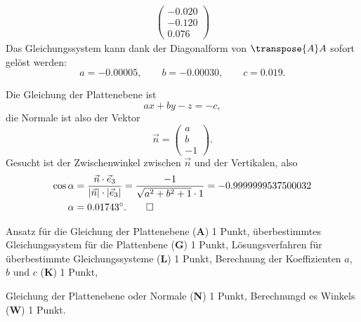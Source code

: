\begin{loesung}
\begin{teilaufgaben}
\begin{align*}
\begin{pmatrix}
-0.020\\
-0.120\\
0.076
\end{pmatrix}
\end{align*}
Das Gleichungssystem kann dank der Diagonalform von $\transpose{A}A$
sofort gelöst werden:
\[
a=-0.00005,\qquad b=-0.00030,\qquad c=0.019.
\]
\item
Die Gleichung der Plattenebene ist
\[
ax+by-z=-c,
\]
die Normale ist also der Vektor
\[
\vec n=\begin{pmatrix}a\\b\\-1\end{pmatrix}.
\]
Gesucht ist der Zwischenwinkel zwischen $\vec n$ und der Vertikalen,
also
\begin{align*}
\cos\alpha&=\frac{\vec n\cdot\vec e_3}{|\vec n|\cdot|\vec e_3|}
=\frac{-1}{\sqrt{a^2+b^2+1}\cdot 1}
=-0.9999999537500032\\
\alpha&=0.01743^\circ.
\qedhere
\end{align*}
\end{teilaufgaben}
\end{loesung}

\begin{bewertung}
\begin{teilaufgaben}
\item
Ansatz für die Gleichung der Plattenebene (\textbf{A}) 1 Punkt,
überbestimmtes Gleichungssystem für die Plattenbene (\textbf{G}) 1 Punkt,
Lösungsverfahren für überbestimmte Gleichungssysteme (\textbf{L}) 1 Punkt,
Berechnung der Koeffizienten $a$, $b$ und $c$ (\textbf{K}) 1 Punkt,
\item
Gleichung der Plattenebene oder Normale (\textbf{N}) 1 Punkt,
Berechnungd es Winkels (\textbf{W}) 1 Punkt.
\end{teilaufgaben}
\end{bewertung}


